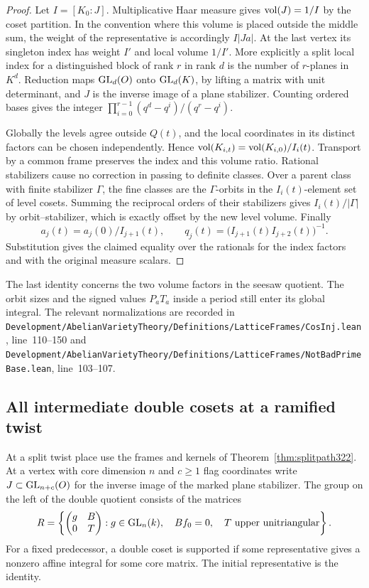 \documentclass[a4paper,11pt]{article}
\theoremstyle{definition}
\theoremstyle{remark}
\newcommand{\srcloc}[2]{{\small\nolinkurl{#1.lean}}, line~#2}
\numberwithin{equation}{section}
\begin{document}
\begin{proof}
Let \(I=[K_0:J]\). Multiplicative Haar measure gives
\({\rm vol}(J)=1/I\) by the coset partition. In the convention
where this volume is placed outside the middle sum, the
weight of the representative is accordingly \(I|Ja|\).
At the last vertex its singleton index has weight \(I'\)
and local volume \(1/I'\). More explicitly a split local
index for a distinguished block of rank \(r\) in rank \(d\)
is the number of \(r\)-planes in \(K^d\). Reduction maps
\({\rm GL}_d(O)\) onto \({\rm GL}_d(K)\), by lifting a
matrix with unit determinant, and \(J\) is the inverse
image of a plane stabilizer. Counting ordered bases gives
the integer \(\prod_{i=0}^{r-1}(q^d-q^i)/(q^r-q^i)\).

Globally the levels agree outside \(Q(t)\), and the local
coordinates in its distinct factors can be chosen independently.
Hence \({\rm vol}(K_{i,t})={\rm vol}(K_{i,0})/I_i(t)\).
Transport by a common frame preserves the index and this
volume ratio. Rational stabilizers cause no correction in
passing to definite classes. Over a parent class with finite
stabilizer \(\Gamma\), the fine classes are the \(\Gamma\)-orbits
in the \(I_i(t)\)-element set of level cosets. Summing the
reciprocal orders of their stabilizers gives
\(I_i(t)/|\Gamma|\) by orbit--stabilizer, which is exactly
offset by the new level volume. Finally
\[
 a_j(t)=a_j(0)/I_{j+1}(t),\qquad
 q_j(t)=\bigl(I_{j+1}(t)I_{j+2}(t)\bigr)^{-1}.
\]
Substitution gives the claimed equality over the rationals
for the index factors and with the original measure scalars.
\end{proof}

The last identity concerns the two volume factors in the
seesaw quotient. The orbit sizes and the signed values
\(P_aT_a\) inside a period still enter its global integral.
The relevant normalizations are recorded in
\srcloc{Development/AbelianVarietyTheory/Definitions/LatticeFrames/CosInj}{110--150}
and \srcloc{Development/AbelianVarietyTheory/Definitions/LatticeFrames/NotBadPrimeBase}{103--107}.

\subsection{All intermediate double cosets at a ramified twist}\label{nav:VIII-66}
At a split twist place use the frames and kernels of
Theorem~\ref{thm:splitpath322}. At a vertex with core
dimension \(n\) and \(c\ge1\) flag coordinates write
\(J\subset{\rm GL}_{n+c}(O)\) for the inverse image of
the marked plane stabilizer. The group on the left of the
double quotient consists of the matrices
\[
 R=\left\{\begin{pmatrix}g&B\\0&T\end{pmatrix}:
   g\in{\rm GL}_{n}(k),\quad B f_0=0,\quad
   T\ \text{upper unitriangular}\right\}.
\]
For a fixed predecessor, a double coset is supported if
some representative gives a nonzero affine integral for
some core matrix. The initial representative is the identity.
\end{document}
